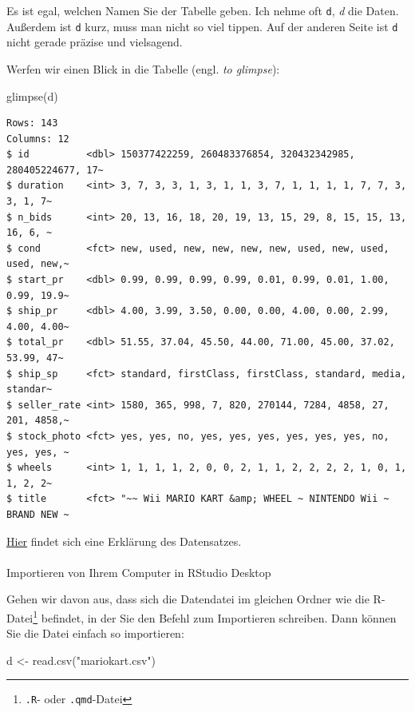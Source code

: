 \documentclass[
  letterpaper,
  DIV=11,
  numbers=noendperiod]{scrartcl}
\makeatletter
\let\oldparagraph\paragraph
\renewcommand{\paragraph}{
    \@ifstar
      \xxxParagraphStar
      \xxxParagraphNoStar
  }
\newcommand{\xxxParagraphStar}[1]{\oldparagraph*{#1}\mbox{}}
\newcommand{\xxxParagraphNoStar}[1]{\oldparagraph{#1}\mbox{}}
\newenvironment{Shaded}{\begin{snugshade}}{\end{snugshade}}
\newcommand{\FunctionTok}[1]{\textcolor[rgb]{0.28,0.35,0.67}{#1}}
\newcommand{\NormalTok}[1]{\textcolor[rgb]{0.00,0.23,0.31}{#1}}
\newcommand{\OtherTok}[1]{\textcolor[rgb]{0.00,0.23,0.31}{#1}}
\newcommand{\StringTok}[1]{\textcolor[rgb]{0.13,0.47,0.30}{#1}}
\theoremstyle{definition}
\theoremstyle{definition}
\theoremstyle{definition}
\theoremstyle{remark}
\makeatother
\begin{document}
Es ist egal, welchen Namen Sie der Tabelle geben. Ich nehme oft
\texttt{d}, \emph{d} die Daten. Außerdem ist \texttt{d} kurz, muss man
nicht so viel tippen. Auf der anderen Seite ist \texttt{d} nicht gerade
präzise und vielsagend.

Werfen wir einen Blick in die Tabelle (engl. \emph{to glimpse}):

\begin{Shaded}
\begin{Highlighting}[]
\FunctionTok{glimpse}\NormalTok{(d)}
\end{Highlighting}
\end{Shaded}

\begin{verbatim}
Rows: 143
Columns: 12
$ id          <dbl> 150377422259, 260483376854, 320432342985, 280405224677, 17~
$ duration    <int> 3, 7, 3, 3, 1, 3, 1, 1, 3, 7, 1, 1, 1, 1, 7, 7, 3, 3, 1, 7~
$ n_bids      <int> 20, 13, 16, 18, 20, 19, 13, 15, 29, 8, 15, 15, 13, 16, 6, ~
$ cond        <fct> new, used, new, new, new, new, used, new, used, used, new,~
$ start_pr    <dbl> 0.99, 0.99, 0.99, 0.99, 0.01, 0.99, 0.01, 1.00, 0.99, 19.9~
$ ship_pr     <dbl> 4.00, 3.99, 3.50, 0.00, 0.00, 4.00, 0.00, 2.99, 4.00, 4.00~
$ total_pr    <dbl> 51.55, 37.04, 45.50, 44.00, 71.00, 45.00, 37.02, 53.99, 47~
$ ship_sp     <fct> standard, firstClass, firstClass, standard, media, standar~
$ seller_rate <int> 1580, 365, 998, 7, 820, 270144, 7284, 4858, 27, 201, 4858,~
$ stock_photo <fct> yes, yes, no, yes, yes, yes, yes, yes, yes, no, yes, yes, ~
$ wheels      <int> 1, 1, 1, 1, 2, 0, 0, 2, 1, 1, 2, 2, 2, 2, 1, 0, 1, 1, 2, 2~
$ title       <fct> "~~ Wii MARIO KART &amp; WHEEL ~ NINTENDO Wii ~ BRAND NEW ~
\end{verbatim}

\href{https://vincentarelbundock.github.io/Rdatasets/doc/openintro/mariokart.html}{Hier}
findet sich eine Erklärung des Datensatzes.

\paragraph{Importieren von Ihrem Computer in RStudio
Desktop}\label{importieren-von-ihrem-computer-in-rstudio-desktop}

Gehen wir davon aus, dass sich die Datendatei im gleichen Ordner wie die
R-Datei\footnote{\texttt{.R}- oder \texttt{.qmd}-Datei} befindet, in der
Sie den Befehl zum Importieren schreiben. Dann können Sie die Datei
einfach so importieren:

\begin{Shaded}
\begin{Highlighting}[]
\NormalTok{d }\OtherTok{\textless{}{-}} \FunctionTok{read.csv}\NormalTok{(}\StringTok{"mariokart.csv"}\NormalTok{)}
\end{Highlighting}
\end{Shaded}
\end{document}

